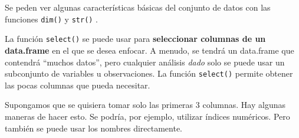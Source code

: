 \documentclass[
]{book}
\newenvironment{Shaded}{\begin{snugshade}}{\end{snugshade}}
\newcommand{\DocumentationTok}[1]{\textcolor[rgb]{0.56,0.35,0.01}{\textbf{\textit{#1}}}}
\newcommand{\FunctionTok}[1]{\textcolor[rgb]{0.00,0.00,0.00}{#1}}
\newcommand{\NormalTok}[1]{#1}
\begin{document}
Se peden ver algunas características básicas del conjunto de datos con las funciones \texttt{dim()} y \texttt{str()} .

\begin{Shaded}
\end{Shaded}

La función \texttt{select()} se puede usar para \textbf{seleccionar columnas de un data.frame} en el que se desea enfocar. A menudo, se tendrá un data.frame que contendrá ``muchos datos'', pero cualquier análisis \emph{dado} solo se puede usar un subconjunto de variables u observaciones. La función \texttt{select()} permite obtener las pocas columnas que pueda necesitar.

Supongamos que se quisiera tomar solo las primeras 3 columnas. Hay algunas maneras de hacer esto. Se podría, por ejemplo, utilizar índices numéricos. Pero también se puede usar los nombres directamente.
\end{document}
